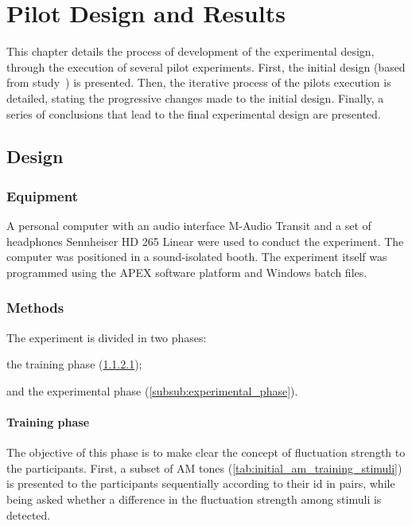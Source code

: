 \documentclass[../main.tex]{subfiles}
\begin{document}
\chapter{Pilot Design and Results}

This chapter details the process of development of the experimental design,
through the execution of several pilot experiments. First, the initial design
(based from \citeauthor{Fastl1982Fluctuation} study~\cite{Fastl1982Fluctuation})
is presented. Then, the iterative process of the pilots execution is detailed,
stating the progressive changes made to the initial design. Finally, a series of
conclusions that lead to the final experimental design are presented.

\section{Design}

\subsection{Equipment}
\label{subsec:pilot_equipment}

A personal computer with an audio interface M-Audio Transit and a set of
headphones Sennheiser HD 265 Linear were used to conduct the experiment. The
computer was positioned in a sound-isolated booth. The experiment itself was
programmed using the APEX software platform and Windows batch files.

\subsection{Methods}

The experiment is divided in two phases:
\begin{inparaenum}[(1)]
  \item the training phase (\ref{subsub:training_phase});
  \item and the experimental phase (\ref{subsub:experimental_phase}).
\end{inparaenum}

\subsubsection{Training phase}
\label{subsub:training_phase}

The objective of this phase is to make clear the concept of fluctuation strength
to the participants. First, a subset of \gls{AM} tones
(\cref{tab:initial_am_training_stimuli}) is presented to the participants
sequentially according to their id in pairs, while being asked whether a
difference in the fluctuation strength among stimuli is detected.
\end{document}
